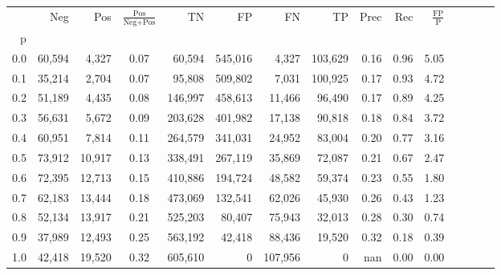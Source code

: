 \begin{tabular}{rrrcrrrrrrrrrrr}
\toprule
{} &     Neg &     Pos & $\frac{\text{Pos}}{\text{Neg}+\text{Pos}}$ &       TN &       FP &       FN &       TP &  Prec &   Rec & $\frac{\text{FP}}{\text{P}}$ \\
p   &         &         &                                            &          &          &          &          &       &       &                              \\
\midrule
0.0 &  60,594 &   4,327 &                                       0.07 &   60,594 &  545,016 &    4,327 &  103,629 &  0.16 &  0.96 &                         5.05 \\
0.1 &  35,214 &   2,704 &                                       0.07 &   95,808 &  509,802 &    7,031 &  100,925 &  0.17 &  0.93 &                         4.72 \\
0.2 &  51,189 &   4,435 &                                       0.08 &  146,997 &  458,613 &   11,466 &   96,490 &  0.17 &  0.89 &                         4.25 \\
0.3 &  56,631 &   5,672 &                                       0.09 &  203,628 &  401,982 &   17,138 &   90,818 &  0.18 &  0.84 &                         3.72 \\
0.4 &  60,951 &   7,814 &                                       0.11 &  264,579 &  341,031 &   24,952 &   83,004 &  0.20 &  0.77 &                         3.16 \\
0.5 &  73,912 &  10,917 &                                       0.13 &  338,491 &  267,119 &   35,869 &   72,087 &  0.21 &  0.67 &                         2.47 \\
0.6 &  72,395 &  12,713 &                                       0.15 &  410,886 &  194,724 &   48,582 &   59,374 &  0.23 &  0.55 &                         1.80 \\
0.7 &  62,183 &  13,444 &                                       0.18 &  473,069 &  132,541 &   62,026 &   45,930 &  0.26 &  0.43 &                         1.23 \\
0.8 &  52,134 &  13,917 &                                       0.21 &  525,203 &   80,407 &   75,943 &   32,013 &  0.28 &  0.30 &                         0.74 \\
0.9 &  37,989 &  12,493 &                                       0.25 &  563,192 &   42,418 &   88,436 &   19,520 &  0.32 &  0.18 &                         0.39 \\
1.0 &  42,418 &  19,520 &                                       0.32 &  605,610 &        0 &  107,956 &        0 &   nan &  0.00 &                         0.00 \\
\bottomrule
\end{tabular}
